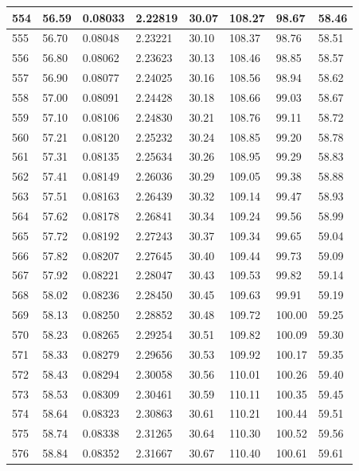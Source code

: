 \documentclass[12pt,a4paper,twoside]{article}
\begin{document}
\begin{center}
\begin{longtable}{l l l l | l l l l}
554 & 56.59 & 0.08033 & 2.22819 & 30.07 & 108.27 & 98.67 & 58.46 \\ \hline
555 & 56.70 & 0.08048 & 2.23221 & 30.10 & 108.37 & 98.76 & 58.51 \\ \hline
556 & 56.80 & 0.08062 & 2.23623 & 30.13 & 108.46 & 98.85 & 58.57 \\ \hline
557 & 56.90 & 0.08077 & 2.24025 & 30.16 & 108.56 & 98.94 & 58.62 \\ \hline
558 & 57.00 & 0.08091 & 2.24428 & 30.18 & 108.66 & 99.03 & 58.67 \\ \hline
559 & 57.10 & 0.08106 & 2.24830 & 30.21 & 108.76 & 99.11 & 58.72 \\ \hline
560 & 57.21 & 0.08120 & 2.25232 & 30.24 & 108.85 & 99.20 & 58.78 \\ \hline
561 & 57.31 & 0.08135 & 2.25634 & 30.26 & 108.95 & 99.29 & 58.83 \\ \hline
562 & 57.41 & 0.08149 & 2.26036 & 30.29 & 109.05 & 99.38 & 58.88 \\ \hline
563 & 57.51 & 0.08163 & 2.26439 & 30.32 & 109.14 & 99.47 & 58.93 \\ \hline
564 & 57.62 & 0.08178 & 2.26841 & 30.34 & 109.24 & 99.56 & 58.99 \\ \hline
565 & 57.72 & 0.08192 & 2.27243 & 30.37 & 109.34 & 99.65 & 59.04 \\ \hline
566 & 57.82 & 0.08207 & 2.27645 & 30.40 & 109.44 & 99.73 & 59.09 \\ \hline
567 & 57.92 & 0.08221 & 2.28047 & 30.43 & 109.53 & 99.82 & 59.14 \\ \hline
568 & 58.02 & 0.08236 & 2.28450 & 30.45 & 109.63 & 99.91 & 59.19 \\ \hline
569 & 58.13 & 0.08250 & 2.28852 & 30.48 & 109.72 & 100.00 & 59.25 \\ \hline
570 & 58.23 & 0.08265 & 2.29254 & 30.51 & 109.82 & 100.09 & 59.30 \\ \hline
571 & 58.33 & 0.08279 & 2.29656 & 30.53 & 109.92 & 100.17 & 59.35 \\ \hline
572 & 58.43 & 0.08294 & 2.30058 & 30.56 & 110.01 & 100.26 & 59.40 \\ \hline
573 & 58.53 & 0.08309 & 2.30461 & 30.59 & 110.11 & 100.35 & 59.45 \\ \hline
574 & 58.64 & 0.08323 & 2.30863 & 30.61 & 110.21 & 100.44 & 59.51 \\ \hline
575 & 58.74 & 0.08338 & 2.31265 & 30.64 & 110.30 & 100.52 & 59.56 \\ \hline
576 & 58.84 & 0.08352 & 2.31667 & 30.67 & 110.40 & 100.61 & 59.61 \\ \hline

\end{longtable}
\end{center}
\end{document}
